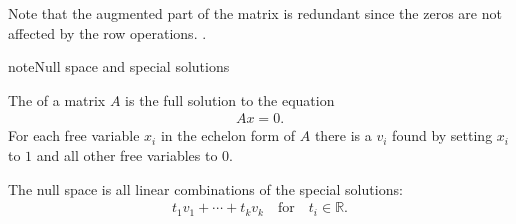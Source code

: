 \documentclass[letterpaper,10pt,english]{jupyterBook}
\begin{document}
\sphinxAtStartPar
Note that the augmented part of the matrix is redundant since the zeros are not affected by the row operations. .

\begin{sphinxadmonition}{note}{Null space and special solutions}

\sphinxAtStartPar
The  of a matrix \(A\) is the full solution to the equation
\begin{equation*}
\begin{split}Ax=0.\end{split}
\end{equation*}
\sphinxAtStartPar
For each free variable \(x_i\) in the echelon form of \(A\) there is a  \(v_i\) found by setting \(x_i\) to \(1\) and all other free variables to \(0\).

\sphinxAtStartPar
The null space is all linear combinations of the special solutions:
\begin{equation*}
\begin{split}t_1v_1 + \cdots + t_kv_k\quad \mathrm{for}\quad t_i\in\mathbb{R}.\end{split}
\end{equation*}\end{sphinxadmonition}
\end{document}

